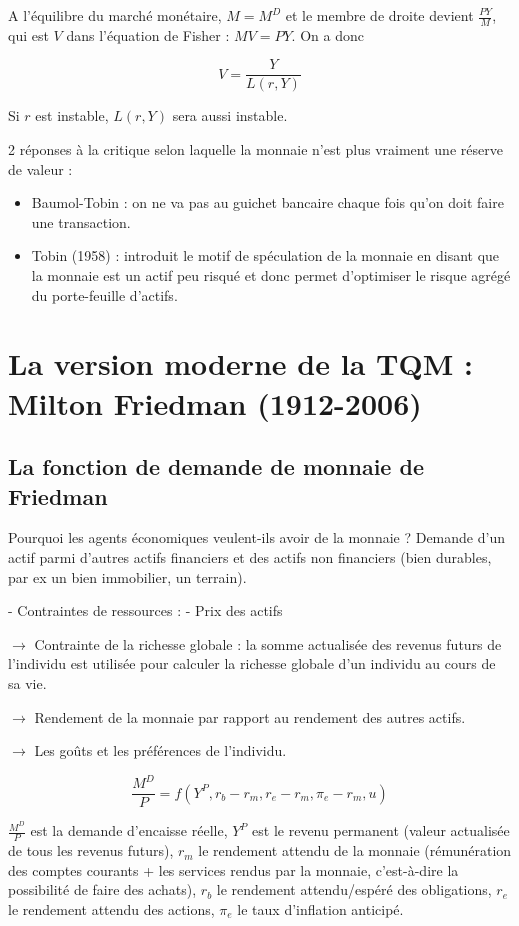 	A l'équilibre du marché monétaire, $M = M^D$ et le membre de droite devient $\frac{PY}{M}$, qui est $V$ dans l'équation de Fisher : $MV = PY$. On a donc
	
	$$V = \frac{Y}{L(r, Y)}$$
	
	Si $r$ est instable, $L(r, Y)$ sera aussi instable.
	
	2 réponses à la critique selon laquelle la monnaie n'est plus vraiment une réserve de valeur :
	
	\begin{itemize}
		\item Baumol-Tobin : on ne va pas au guichet bancaire chaque fois qu'on doit faire une transaction.
		\item Tobin (1958) : introduit le motif de spéculation de la monnaie en disant que la monnaie est un actif peu risqué et donc permet d'optimiser le risque agrégé du porte-feuille d'actifs.
	\end{itemize}
	
	
\section{La version moderne de la TQM : Milton Friedman (1912-2006)}

	\subsection{La fonction de demande de monnaie de Friedman}
	
	Pourquoi les agents économiques veulent-ils avoir de la monnaie ? Demande d'un actif parmi d'autres actifs financiers et des actifs non financiers (bien durables, par ex un bien immobilier, un terrain).
	
	- Contraintes de ressources : 
	- Prix des actifs
	
	$\rightarrow$ Contrainte de la richesse globale : la somme actualisée des revenus futurs de l'individu est utilisée pour calculer la richesse globale d'un individu au cours de sa vie.
	
	$\rightarrow$ Rendement de la monnaie par rapport au rendement des autres actifs.
	
	$\rightarrow$ Les goûts et les préférences de l'individu.
	
	$$\frac{M^D}{P} = f(Y^P, r_b - r_m, r_e - r_m,\pi_e - r_m, u)$$
	
	$\frac{M^D}{P}$ est la demande d'encaisse réelle, $Y^P$ est le revenu permanent (valeur actualisée de tous les revenus futurs), $r_m$ le rendement attendu de la monnaie (rémunération des comptes courants + les services rendus par la monnaie, c'est-à-dire la possibilité de faire des achats), $r_b$ le rendement attendu/espéré des obligations, $r_e$ le rendement attendu des actions, $\pi_e$ le taux d'inflation anticipé.
	
